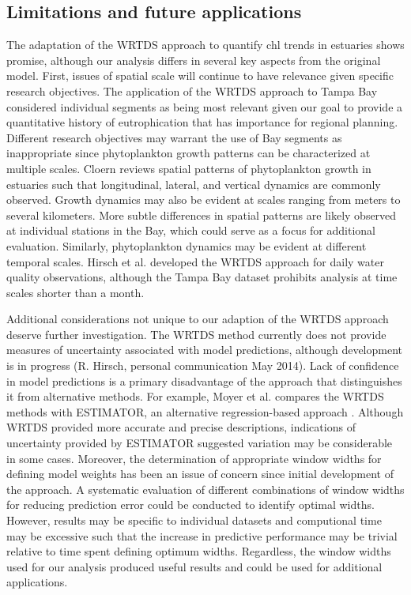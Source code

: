 \documentclass{svjour3}\usepackage[]{graphicx}\usepackage[]{color}
\begin{document}
\subsection{Limitations and future applications}

The adaptation of the \ac{WRTDS} approach to quantify \ac{chl} trends in estuaries shows promise, although our analysis differs in several key aspects from the original model.  First, issues of spatial scale will continue to have relevance given specific research objectives.  The application of the \ac{WRTDS} approach to Tampa Bay considered individual segments as being most relevant given our goal to provide a quantitative history of eutrophication that has importance for regional planning.  Different research objectives may warrant the use of Bay segments as inappropriate since phytoplankton growth patterns can be characterized at multiple scales.  Cloern \cite{Cloern96} reviews spatial patterns of phytoplankton growth in estuaries such that longitudinal, lateral, and vertical dynamics are commonly observed.  Growth dynamics may also be evident at scales ranging from meters to several kilometers.  More subtle differences in spatial patterns are likely observed at individual stations in the Bay, which could serve as a focus for additional evaluation. Similarly, phytoplankton dynamics may be evident at different temporal scales.  Hirsch et al. \cite{Hirsch10} developed the \ac{WRTDS} approach for daily water quality observations, although the Tampa Bay dataset prohibits analysis at time scales shorter than a month.

Additional considerations not unique to our adaption of the \ac{WRTDS} approach deserve further investigation.  The \ac{WRTDS} method currently does not provide measures of uncertainty associated with model predictions, although development is in progress (R. Hirsch, personal communication May 2014). Lack of confidence in model predictions is a primary disadvantage of the approach that distinguishes it from alternative methods.  For example, Moyer et al. \cite{Moyer12} compares the \ac{WRTDS} methods with ESTIMATOR, an alternative regression-based approach \cite{Cohn92}.  Although \ac{WRTDS} provided more accurate and precise descriptions, indications of uncertainty provided by ESTIMATOR suggested variation may be considerable in some cases.  Moreover, the determination of appropriate window widths for defining model weights has been an issue of concern since initial development of the approach.  A systematic evaluation of different combinations of window widths for reducing prediction error could be conducted to identify optimal widths.  However, results may be specific to individual datasets and computional time may be excessive such that the increase in predictive performance may be trivial relative to time spent defining optimum widths.  Regardless, the window widths used for our analysis produced useful results and could be used for additional applications.
\end{document}
